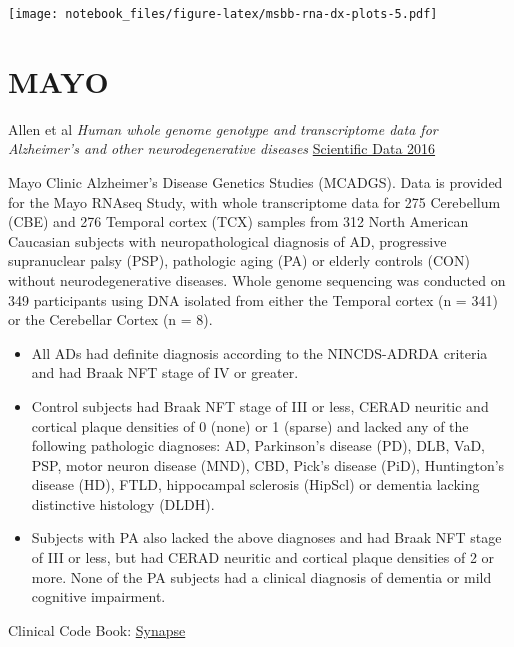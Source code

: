 \documentclass[]{book}
\newenvironment{Shaded}{\begin{snugshade}}{\end{snugshade}}
\newcommand{\CommentTok}[1]{\textcolor[rgb]{0.56,0.35,0.01}{\textit{#1}}}
\newcommand{\DataTypeTok}[1]{\textcolor[rgb]{0.13,0.29,0.53}{#1}}
\newcommand{\KeywordTok}[1]{\textcolor[rgb]{0.13,0.29,0.53}{\textbf{#1}}}
\newcommand{\NormalTok}[1]{#1}
\newcommand{\OperatorTok}[1]{\textcolor[rgb]{0.81,0.36,0.00}{\textbf{#1}}}
\newcommand{\StringTok}[1]{\textcolor[rgb]{0.31,0.60,0.02}{#1}}
\providecommand{\tightlist}{%
  \setlength{\itemsep}{0pt}\setlength{\parskip}{0pt}}
\begin{document}
\texttt{[image: notebook\_files/figure-latex/msbb-rna-dx-plots-5.pdf]}

\hypertarget{mayo}{%
\chapter{MAYO}\label{mayo}}

Allen et al \emph{Human whole genome genotype and transcriptome data for Alzheimer's and other neurodegenerative diseases} \href{https://www.nature.com/articles/sdata201689}{Scientific Data 2016}

Mayo Clinic Alzheimer's Disease Genetics Studies (MCADGS). Data is provided for the Mayo RNAseq Study, with whole transcriptome data for 275 Cerebellum (CBE) and 276 Temporal cortex (TCX) samples from 312 North American Caucasian subjects with neuropathological diagnosis of AD, progressive supranuclear palsy (PSP), pathologic aging (PA) or elderly controls (CON) without neurodegenerative diseases. Whole genome sequencing was conducted on 349 participants using DNA isolated from either the Temporal cortex (n = 341) or the Cerebellar Cortex (n = 8).

\begin{itemize}
\tightlist
\item
  All ADs had definite diagnosis according to the NINCDS-ADRDA criteria and had Braak NFT stage of IV or greater.
\item
  Control subjects had Braak NFT stage of III or less, CERAD neuritic and cortical plaque densities of 0 (none) or 1 (sparse) and lacked any of the following pathologic diagnoses: AD, Parkinson's disease (PD), DLB, VaD, PSP, motor neuron disease (MND), CBD, Pick's disease (PiD), Huntington's disease (HD), FTLD, hippocampal sclerosis (HipScl) or dementia lacking distinctive histology (DLDH).
\item
  Subjects with PA also lacked the above diagnoses and had Braak NFT stage of III or less, but had CERAD neuritic and cortical plaque densities of 2 or more. None of the PA subjects had a clinical diagnosis of dementia or mild cognitive impairment.
\end{itemize}

Clinical Code Book: \href{https://adknowledgeportal.synapse.org/Explore/Studies?Study=syn5550404}{Synapse}

\begin{Shaded}
\end{Shaded}
\end{document}
